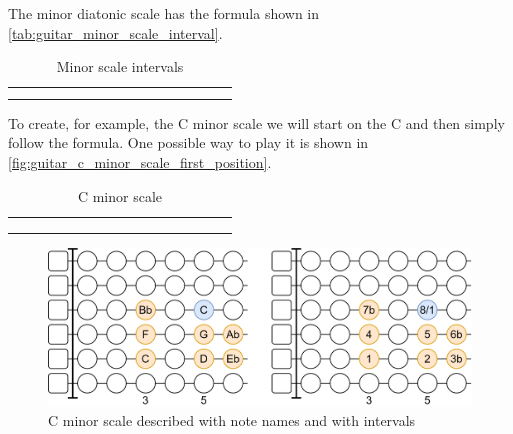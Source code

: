 The minor diatonic scale has the formula shown in \autoref{tab:guitar_minor_scale_interval}.

\begin{table}[h]
	\centering
	\begin{NiceTabular}{*{16}{P{0.05mm}}}
		\Block{}{} &  & &  & &  & &  & &  & &  & &  & & \Block{}{} \\
		 & &  & &  & &  & &  & &  & &  & &  & 
	\end{NiceTabular}
	\caption{Minor scale intervals}
	\label{tab:guitar_minor_scale_interval}
\end{table}

To create, for example, the C minor scale we will start on the C and then simply follow the formula. One possible way to play it is shown in \autoref{fig:guitar_c_minor_scale_first_position}.

\begin{table}[h]
	\centering
	\begin{NiceTabular}{*{16}{P{0.05mm}}}
		\Block{}{} &  & &  & &  & &  & &  & &  & &  & & \Block{}{} \\
		 & &  & &  & &  & &  & &  & &  & &  & \\
		 & &  & &  & &  & &  & &  & &  & &  & 
	\end{NiceTabular}
	\caption{C minor scale}
	\label{tab:guitar_c_minor_scale}
\end{table}

\begin{figure}[h]
	\centering
	\includegraphics[height=0.2\textheight]{../../Images/CMinorScaleFirstPosition.png}
	\caption{C minor scale described with note names and with intervals}
	\label{fig:guitar_c_minor_scale_first_position}
\end{figure}

